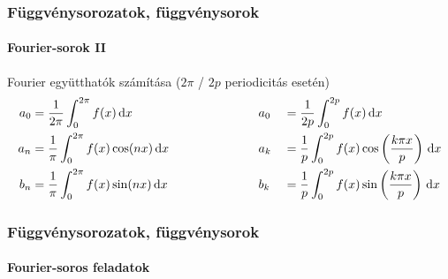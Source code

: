 \begin{frame}
  \frametitle{Függvénysorozatok, függvénysorok}
  \framesubtitle{Fourier-sorok II}

  \begin{block}{Fourier együtthatók számítása ($2\pi$ / $2p$ periodicitás esetén)}
    \begin{alignat*}{9}
      a_0 & =
      \frac{1}{2\pi} \int_0^{2\pi} f(x) \, \mathrm d x
          &   & a_0
          &   & =
      \frac{1}{2p} \int_0^{2p} f(x) \, \mathrm d x
      \\
      a_n & =
      \frac{1}{\pi} \int_0^{2\pi} f(x) \cos(n x) \, \mathrm d x
      \hspace{2.2cm}
          &   & a_k
          &   & =
      \frac{1}{p} \int_0^{2p} f(x) \cos \left( \frac{k \pi x}{p} \right) \, \mathrm d x
      \\
      b_n & =
      \frac{1}{\pi} \int_0^{2\pi} f(x) \sin(n x) \, \mathrm d x
          &   & b_k
          &   & =
      \frac{1}{p} \int_0^{2p} f(x) \sin \left( \frac{k \pi x}{p} \right) \, \mathrm d x
    \end{alignat*}
  \end{block}
\end{frame}

\begin{frame}
  \frametitle{Függvénysorozatok, függvénysorok}
  \framesubtitle{Fourier-soros feladatok}

  
  
\end{frame}
